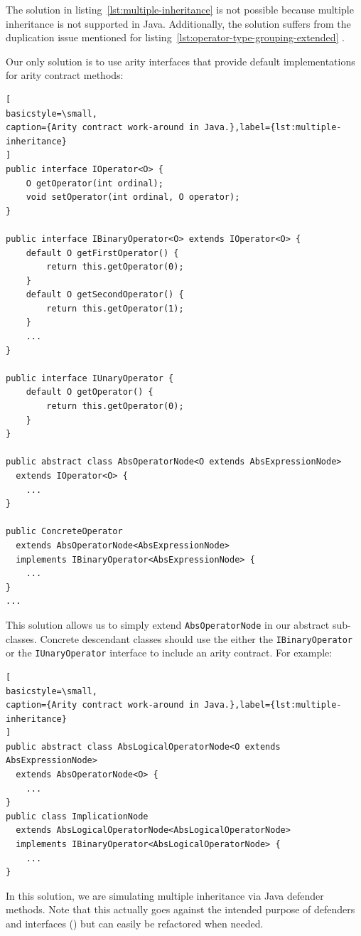 \documentclass[12pt,oneside,a4paper,notitlepage]{report}
\begin{document}
	\par The solution in listing~\ref{lst:multiple-inheritance} is not possible because multiple inheritance is not supported in Java. Additionally, the solution suffers from the duplication issue mentioned for listing~\ref{lst:operator-type-grouping-extended} .

	\bigskip

	\newpage

	\par Our only solution is to use arity interfaces that provide default implementations for arity contract methods:
	\begin{lstlisting}[
basicstyle=\small,
caption={Arity contract work-around in Java.},label={lst:multiple-inheritance}
]
public interface IOperator<O> {
	O getOperator(int ordinal);
	void setOperator(int ordinal, O operator);
}

public interface IBinaryOperator<O> extends IOperator<O> {
	default O getFirstOperator() {
		return this.getOperator(0);
	}
	default O getSecondOperator() {
		return this.getOperator(1);
	}
	...
}
	
public interface IUnaryOperator {
	default O getOperator() {
		return this.getOperator(0);
	}
}

public abstract class AbsOperatorNode<O extends AbsExpressionNode>
  extends IOperator<O> {
	...
}

public ConcreteOperator
  extends AbsOperatorNode<AbsExpressionNode>
  implements IBinaryOperator<AbsExpressionNode> {
	...
}
...
	\end{lstlisting}

	\newpage

	\par This solution allows us to simply extend \texttt{AbsOperatorNode} in our abstract sub-classes. Concrete descendant classes should use the either the \texttt{IBinaryOperator} or the \texttt{IUnaryOperator} interface to include an arity contract. For example:
	\begin{lstlisting}[
basicstyle=\small,
caption={Arity contract work-around in Java.},label={lst:multiple-inheritance}
]
public abstract class AbsLogicalOperatorNode<O extends AbsExpressionNode>
  extends AbsOperatorNode<O> {
	...
}
public class ImplicationNode
  extends AbsLogicalOperatorNode<AbsLogicalOperatorNode>
  implements IBinaryOperator<AbsLogicalOperatorNode> {
	...
}
	\end{lstlisting}

	\par In this solution, we are simulating multiple inheritance via Java defender methods. Note that this actually goes against the intended purpose of defenders and interfaces (\cite{defaultmethodslink}) but can easily be refactored when needed.
\end{document}
